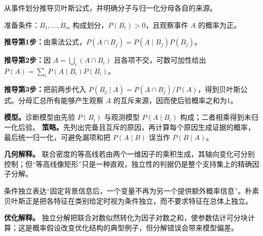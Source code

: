 \label{struct:V1-C04-CH11}

\begin{derivationgoalbox}
从事件划分推导贝叶斯公式，并明确分子与归一化分母各自的来源。
\end{derivationgoalbox}
\begin{derivationprepbox}
准备条件：$B_1,\ldots,B_m$ 构成划分，$P(B_i)>0$，且观察事件 $A$ 的概率为正。
\end{derivationprepbox}
\textbf{推导第1步：}由乘法公式，$P(A\cap B_j)=P(A\mid B_j)P(B_j)$。

\textbf{推导第2步：}因 $A=\bigcup_i(A\cap B_i)$ 且各项不交，可数可加性给出 $P(A)=\sum_iP(A\mid B_i)P(B_i)$。

\textbf{推导第3步：}把前两步代入 $P(B_j\mid A)=P(A\cap B_j)/P(A)$，得到贝叶斯公式。分母汇总所有能够产生观察 $A$ 的互斥来源，因而使后验概率之和为1。

\label{struct:V1-C04-CH08}
\textbf{模型。}诊断模型由先验 $P(B_i)$ 与观测模型 $P(A\mid B_i)$ 构成；二者相乘得到未归一化后验。
\label{struct:V1-C04-CH09}
\textbf{策略。}先列出完备且互斥的原因，再计算每个原因生成证据的概率，最后统一归一化，可避免漏项和把 $P(A\mid B)$ 误当作 $P(B\mid A)$。

\label{struct:V1-C04-CH10}
\label{struct:V1-C04-CH21}
\label{struct:V1-C04-CH22}
\label{struct:V1-C04-CH23}
\label{struct:V1-C04-CH24}
\label{struct:V1-C04-CH25}
\label{struct:V1-C04-CH26}
\label{struct:V1-C04-CH27}
\begin{geometrybox}
\textbf{几何解释。}
联合密度的等高线若由两个一维因子的乘积生成，其轴向变化可分别控制；但“等高线像矩形”只是一种直观，独立性的判据仍是整个支持集上的精确因子分解。
\end{geometrybox}
\label{struct:V1-C04-CH17}
\begin{probabilitybox}
条件独立表达“固定背景信息后，一个变量不再为另一个提供额外概率信息”。朴素贝叶斯正是把各特征在类别给定时视为条件独立，而不要求特征在总体上独立。
\end{probabilitybox}
\label{struct:V1-C04-CH18}
\begin{optimizationbox}
\textbf{优化解释。}
独立分解把联合对数似然转化为因子对数之和，使参数估计可分块计算；这是概率假设改变优化结构的典型例子，但分解错误会带来模型偏差。
\end{optimizationbox}


